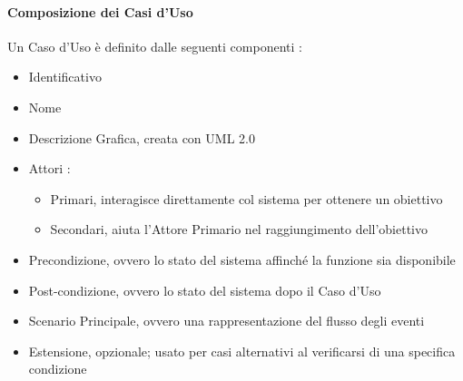 		
		\paragraph{Composizione dei Casi d'Uso} \hfill \break
		Un Caso d'Uso è definito dalle seguenti componenti : 
		
		\begin{itemize}
			\item Identificativo
			\item Nome
			\item Descrizione Grafica, creata con UML 2.0
			\item Attori :
			\begin{itemize}
				\item Primari, interagisce direttamente col sistema per ottenere un obiettivo
				\item Secondari, aiuta l'Attore Primario nel raggiungimento dell'obiettivo
			\end{itemize}
			\item Precondizione, ovvero lo stato del sistema affinché la funzione sia disponibile
			\item Post-condizione, ovvero lo stato del sistema dopo il Caso d'Uso
			\item Scenario Principale, ovvero una rappresentazione del flusso degli eventi
			\item Estensione, opzionale; usato per casi alternativi al verificarsi di una specifica condizione
		\end{itemize}
		

